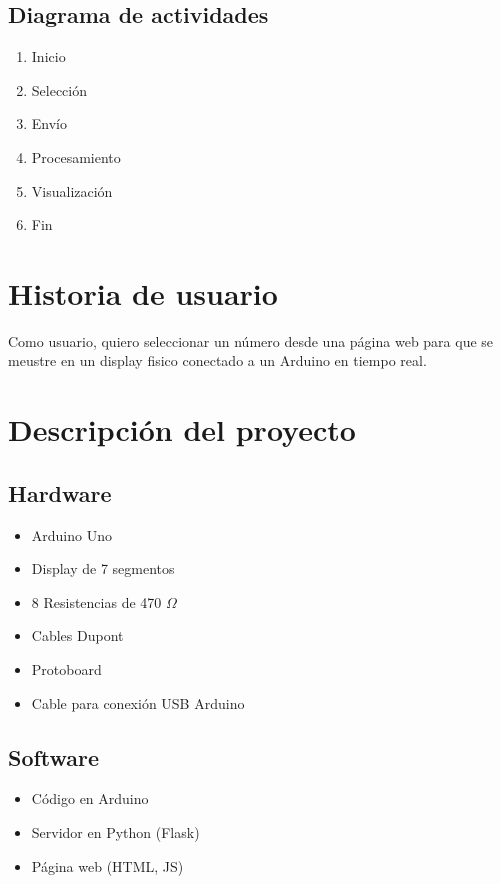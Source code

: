 \documentclass{article}
\begin{document}
    \subsection{Diagrama de actividades}
        \begin{enumerate}
            \item Inicio
            \item Selección
            \item Envío
            \item Procesamiento
            \item Visualización
            \item Fin
        \end{enumerate}

\section{Historia de usuario}
Como usuario, quiero seleccionar un número desde una página web para que se meustre en un display fisico conectado a un Arduino en tiempo real.

\section{Descripción del proyecto}
    \subsection{Hardware}
        \begin{itemize}
            \item Arduino Uno
            \item Display de 7 segmentos
            \item 8 Resistencias de 470 $\Omega$
            \item Cables Dupont
            \item Protoboard
            \item Cable para conexión USB Arduino
        \end{itemize}

    \subsection{Software}
        \begin{itemize}
            \item Código en Arduino
            \item Servidor en Python (Flask)
            \item Página web (HTML, JS)
        \end{itemize}
\end{document}
